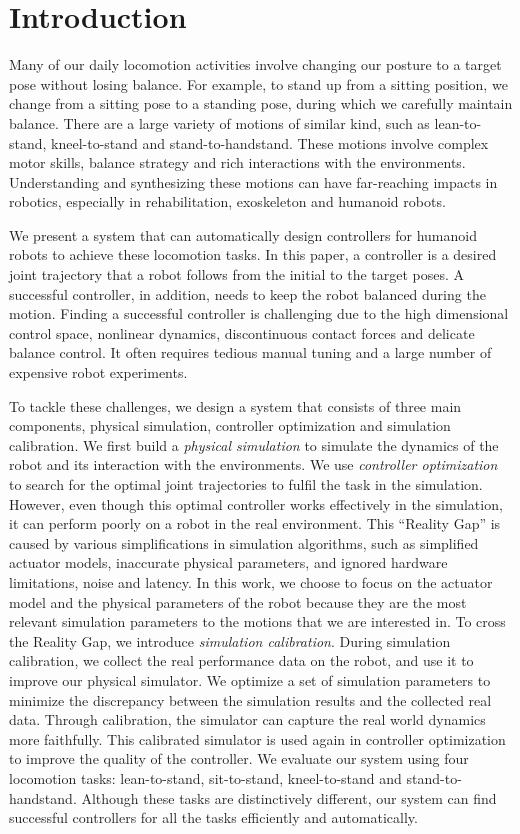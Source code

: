 \section{Introduction}
Many of our daily locomotion activities involve changing our posture to a target pose without losing balance. For example, to stand up from a sitting position, we change from a sitting pose to a standing pose, during which we carefully maintain balance. There are a large variety of motions of similar kind, such as lean-to-stand, kneel-to-stand and stand-to-handstand. These motions involve complex motor skills, balance strategy and rich interactions with the environments. Understanding and synthesizing these motions can have far-reaching impacts in robotics, especially in rehabilitation, exoskeleton and humanoid robots.

We present a system that can automatically design controllers for humanoid robots to achieve these locomotion tasks. In this paper, a controller is a desired joint trajectory that a robot follows from the initial to the target poses. A successful controller, in addition, needs to keep the robot balanced during the motion. Finding a successful controller is challenging due to the high dimensional control space, nonlinear dynamics, discontinuous contact forces and delicate balance control. It often requires tedious manual tuning and a large number of expensive robot experiments. 

To tackle these challenges, we design a system that consists of three main components, physical simulation, controller optimization and simulation calibration. We first build a \emph{physical simulation} to simulate the dynamics of the robot and its interaction with the environments. We use \emph{controller optimization} to search for the optimal joint trajectories to fulfil the task in the simulation. However, even though this optimal controller works effectively in the simulation, it can perform poorly on a robot in the real environment. This ``Reality Gap'' \cite{Jakobi95} is caused by various simplifications in simulation algorithms, such as simplified actuator models, inaccurate physical parameters, and ignored hardware limitations, noise and latency. In this work, we choose to focus on the actuator model and the physical parameters of the robot because they are the most relevant simulation parameters to the motions that we are interested in. To cross the Reality Gap, we introduce \emph{simulation calibration}. During simulation calibration, we collect the real performance data on the robot, and use it to improve our physical simulator. We optimize a set of simulation parameters to minimize the discrepancy between the simulation results and the collected real data. Through calibration, the simulator can capture the real world dynamics more faithfully. This calibrated simulator is used again in controller optimization to improve the quality of the controller. We evaluate our system using four locomotion tasks: lean-to-stand, sit-to-stand, kneel-to-stand and stand-to-handstand. Although these tasks are distinctively different, our system can find successful controllers for all the tasks efficiently and automatically.

